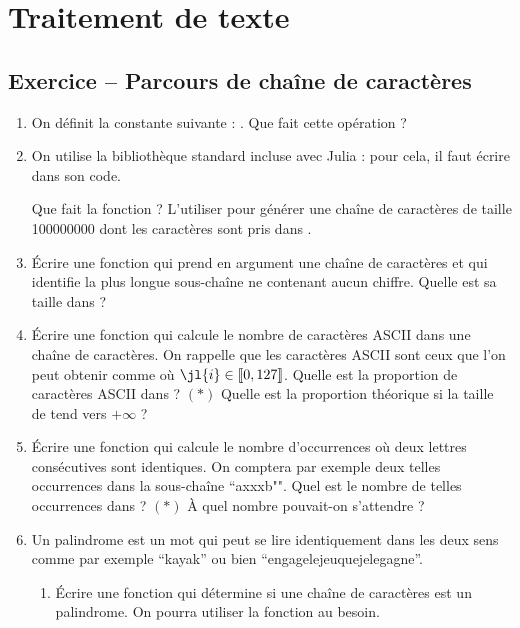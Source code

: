 \documentclass{article}
\newcounter{loop}
\newcounter{numEx}
\newcommand{\exo}[1]{
	\stepcounter{numEx}
	\setcounter{loop}{0}
	\subsection*{Exercice \arabic{numEx} -- #1}
}
\newcommand{\llbra}{\left\llbracket}
\newcommand{\rrbra}{\right\rrbracket}
\renewcommand{\brack}[1]{\ensuremath{\llbra#1\rrbra}}
\begin{document}
{\section{Traitement de texte}

\exo{Parcours de chaîne de caractères}

\begin{enumerate}
	\item On définit la constante suivante : . Que fait cette opération ?

	\item On utilise la bibliothèque standard  incluse avec Julia : pour cela, il faut écrire  dans son code.

	Que fait la fonction  ? L'utiliser pour générer une chaîne de caractères  de taille \num{100000000} dont les caractères sont pris dans .

	\item Écrire une fonction qui prend en argument une chaîne de caractères et qui identifie la plus longue sous-chaîne ne contenant aucun chiffre. Quelle est sa taille dans  ?

	\item Écrire une fonction qui calcule le nombre de caractères ASCII dans une chaîne de caractères. On rappelle que les caractères ASCII sont ceux que l'on peut obtenir comme  où $\jl{i}\in\brack{0, 127}$. Quelle est la proportion de caractères ASCII dans  ? $(*)$ Quelle est la proportion théorique si la taille de  tend vers $+\infty$ ?

	\item Écrire une fonction qui calcule le nombre d'occurrences où deux lettres consécutives sont identiques. On comptera par exemple deux telles occurrences dans la sous-chaîne ``axxxb"". Quel est le nombre de telles occurrences dans  ? $(*)$ À quel nombre pouvait-on s'attendre ?

	\item Un palindrome est un mot qui peut se lire identiquement dans les deux sens comme par exemple ``kayak'' ou bien ``engagelejeuquejelegagne''.
	\begin{enumerate}
		\item Écrire une fonction  qui détermine si une chaîne de caractères est un palindrome. On pourra utiliser la fonction  au besoin.


\end{enumerate}
\end{enumerate}}
\end{document}
